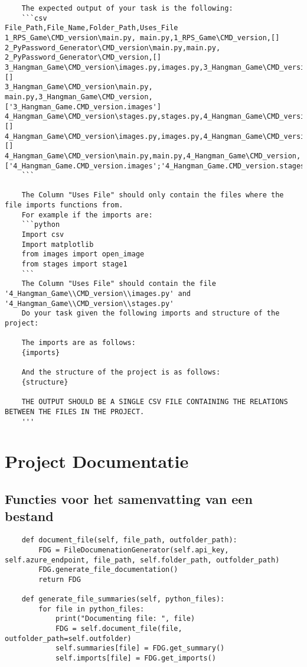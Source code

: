 \begin{verbatim}
    The expected output of your task is the following:
    ```csv
File_Path,File_Name,Folder_Path,Uses_File
1_RPS_Game\CMD_version\main.py, main.py,1_RPS_Game\CMD_version,[]
2_PyPassword_Generator\CMD_version\main.py,main.py, 2_PyPassword_Generator\CMD_version,[]
3_Hangman_Game\CMD_version\images.py,images.py,3_Hangman_Game\CMD_version,[]
3_Hangman_Game\CMD_version\main.py, main.py,3_Hangman_Game\CMD_version,['3_Hangman_Game.CMD_version.images']
4_Hangman_Game\CMD_version\stages.py,stages.py,4_Hangman_Game\CMD_version,[]
4_Hangman_Game\CMD_version\images.py,images.py,4_Hangman_Game\CMD_version,[]
4_Hangman_Game\CMD_version\main.py,main.py,4_Hangman_Game\CMD_version,['4_Hangman_Game.CMD_version.images';'4_Hangman_Game.CMD_version.stages']
    ```

    The Column "Uses File" should only contain the files where the file imports functions from.
    For example if the imports are:
    ```python
    Import csv
    Import matplotlib
    from images import open_image
    from stages import stage1
    ```
    The Column "Uses File" should contain the file '4_Hangman_Game\\CMD_version\\images.py' and '4_Hangman_Game\\CMD_version\\stages.py'
    Do your task given the following imports and structure of the project:
    
    The imports are as follows:
    {imports}

    And the structure of the project is as follows:
    {structure}

    THE OUTPUT SHOULD BE A SINGLE CSV FILE CONTAINING THE RELATIONS BETWEEN THE FILES IN THE PROJECT.
    '''
\end{verbatim}

\section{Project Documentatie}

\subsection{Functies voor het samenvatting van een bestand}
\label{bijlage:file-summary-functions}
\begin{verbatim}
    def document_file(self, file_path, outfolder_path):
        FDG = FileDocumenationGenerator(self.api_key, self.azure_endpoint, file_path, self.folder_path, outfolder_path)
        FDG.generate_file_documentation()
        return FDG

    def generate_file_summaries(self, python_files):
        for file in python_files:
            print("Documenting file: ", file)
            FDG = self.document_file(file, outfolder_path=self.outfolder)
            self.summaries[file] = FDG.get_summary()
            self.imports[file] = FDG.get_imports()
\end{verbatim}
